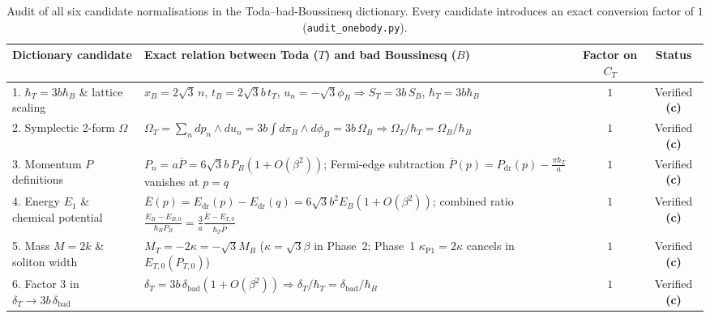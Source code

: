 \documentclass[11pt,a4paper]{article}
\newcommand{\claim}[1]{\textbf{(#1)}}
\begin{document}
\begin{table}[ht!]
\centering
\small
\begin{tabular}{@{}p{4.6cm}p{6.6cm}cc@{}}
\toprule
Dictionary candidate & Exact relation between Toda ($T$) and bad Boussinesq ($B$) & Factor on $C_T$ & Status \\
\midrule
1. $\hbar_T = 3b\hbar_B$ \& lattice scaling & $x_B = 2\sqrt{3}\,n$, $t_B = 2\sqrt{3}b\,t_T$, $u_n = -\sqrt{3}\phi_B \Rightarrow S_T = 3b\,S_B$, $\hbar_T = 3b\hbar_B$ & $1$ & Verified \claim{c} \\
2. Symplectic 2-form $\Omega$ & $\Omega_T = \sum_n dp_n\wedge du_n = 3b\int d\pi_B\wedge d\phi_B = 3b\,\Omega_B \Rightarrow \Omega_T/\hbar_T = \Omega_B/\hbar_B$ & $1$ & Verified \claim{c} \\
3. Momentum $P$ definitions & $P_n = a\overline{P} = 6\sqrt{3}b\,P_B(1+O(\beta^2))$; Fermi-edge subtraction $\overline{P}(p)=P_{\mathrm{dr}}(p)-\frac{\pi\hbar_T}{a}$ vanishes at $p=q$ & $1$ & Verified \claim{c} \\
4. Energy $E_1$ \& chemical potential & $\overline{E}(p) = E_{\mathrm{dr}}(p)-E_{\mathrm{dr}}(q) = 6\sqrt{3}b^2 E_B(1+O(\beta^2))$; combined ratio $\frac{E_B-E_{B,0}}{\hbar_B P_B} = \frac{3}{a}\frac{\overline{E}-E_{T,0}}{\hbar_T\overline{P}}$ & $1$ & Verified \claim{c} \\
5. Mass $M=2k$ \& soliton width & $M_T = -2\kappa = -\sqrt{3}M_B$ ($\kappa = \sqrt{3}\beta$ in Phase~2; Phase~1 $\kappa_{\mathrm{P1}}=2\kappa$ cancels in $E_{T,0}(P_{T,0})$) & $1$ & Verified \claim{c} \\
6. Factor $3$ in $\delta_T \to 3b\,\delta_{\mathrm{bad}}$ & $\delta_T = 3b\,\delta_{\mathrm{bad}}(1+O(\beta^2)) \Rightarrow \delta_T/\hbar_T = \delta_{\mathrm{bad}}/\hbar_B$ & $1$ & Verified \claim{c} \\
\bottomrule
\end{tabular}
\caption{Audit of all six candidate normalisations in the Toda--bad-Boussinesq dictionary. Every candidate introduces an exact conversion factor of $1$ (\texttt{audit\_onebody.py}).}
\label{tab:dict-hunt}
\end{table}
\end{document}
